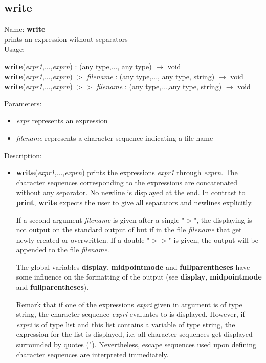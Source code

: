 \subsection{write}
\label{labwrite}
\noindent Name: \textbf{write}\\
prints an expression without separators\\
\noindent Usage: 
\begin{center}
\textbf{write}(\emph{expr1},...,\emph{exprn}) : (\textsf{any type},..., \textsf{any type}) $\rightarrow$ \textsf{void}
\\ 
\textbf{write}(\emph{expr1},...,\emph{exprn}) $>$ \emph{filename} : (\textsf{any type},..., \textsf{any type}, \textsf{string}) $\rightarrow$ \textsf{void}
\\ 
\textbf{write}(\emph{expr1},...,\emph{exprn}) $>>$ \emph{filename} : (\textsf{any type},...,\textsf{any type}, \textsf{string}) $\rightarrow$ \textsf{void}
\\ 
\end{center}
Parameters: 
\begin{itemize}
\item \emph{expr} represents an expression
\item \emph{filename} represents a character sequence indicating a file name
\end{itemize}
\noindent Description: \begin{itemize}

\item \textbf{write}(\emph{expr1},...,\emph{exprn}) prints the expressions \emph{expr1} through
   \emph{exprn}. The character sequences corresponding to the expressions are
   concatenated without any separator. No newline is displayed at the
   end.  In contrast to \textbf{print}, \textbf{write} expects the user to give all
   separators and newlines explicitly.
    
   If a second argument \emph{filename} is given after a single "$>$", the
   displaying is not output on the standard output of \sollya but if in
   the file \emph{filename} that get newly created or overwritten. If a double
    "$>>$" is given, the output will be appended to the file \emph{filename}.
    
   The global variables \textbf{display}, \textbf{midpointmode} and \textbf{fullparentheses} have
   some influence on the formatting of the output (see \textbf{display},
   \textbf{midpointmode} and \textbf{fullparentheses}).
    
   Remark that if one of the expressions \emph{expri} given in argument is of
   type \textsf{string}, the character sequence \emph{expri} evaluates to is
   displayed. However, if \emph{expri} is of type \textsf{list} and this list
   contains a variable of type \textsf{string}, the expression for the list
   is displayed, i.e.  all character sequences get displayed surrounded
   by quotes ("). Nevertheless, escape sequences used upon defining
   character sequences are interpreted immediately.
\end{itemize}
